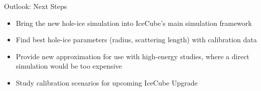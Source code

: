 
\begin{frame}{Outlook: Next Steps}
  \begin{itemize}
    \item Bring the new hole-ice simulation into IceCube's main simulation framework
    \item Find best hole-ice parameters (radius, scattering length) with calibration data
    \item Provide new approximation for use with high-energy studies, where a direct simulation would be too expensive
    \item Study calibration scenarios for upcoming IceCube Upgrade
  \end{itemize}
\end{frame}
